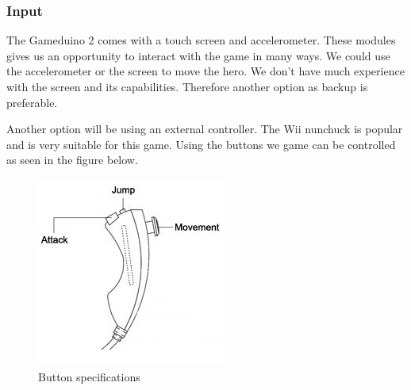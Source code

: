 \subsubsection{Input}
The Gameduino 2 comes with a touch screen and accelerometer.
These modules gives us an opportunity to interact with the game
in many ways. We could use the accelerometer or the screen to
move the hero. We don’t have much experience with the screen
and its capabilities. Therefore another option as backup is preferable.

Another option will be using an external controller. The Wii nunchuck is popular and is very suitable for this game.  Using the buttons we game can be controlled as seen in the figure below.


\begin{figure}[h]
  \centering
  \includegraphics[scale=0.6]{Figures/nunchuk}
  \caption{Button specifications}
\label{fig:Nunchuk}
\end{figure}
